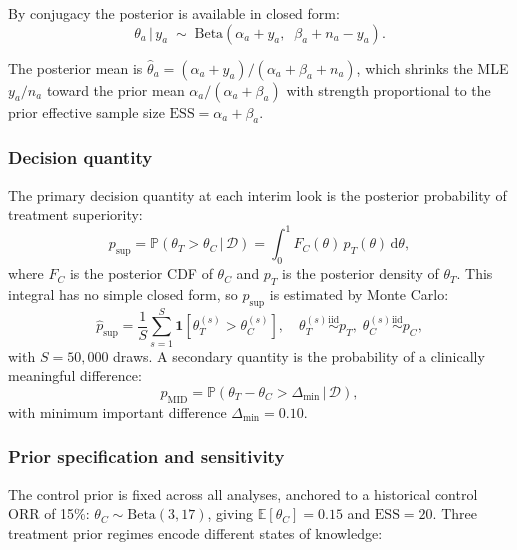 \documentclass[11pt,a4paper]{article}
\newcommand{\E}{\mathbb{E}}
\newcommand{\Prob}{\mathbb{P}}
\newcommand{\given}{\,|\,}
\newcommand{\iid}{\overset{\text{iid}}{\sim}}
\newcommand{\psup}{p_{\text{sup}}}
\newcommand{\thetaT}{\theta_T}
\newcommand{\thetaC}{\theta_C}
\begin{document}
By conjugacy the posterior is available in closed form:
\begin{equation}
  \label{eq:posterior}
  \theta_a \given y_a \;\sim\; \text{Beta}(\alpha_a + y_a,\;\; \beta_a + n_a - y_a).
\end{equation}
 
The posterior mean is $\hat{\theta}_a = (\alpha_a + y_a)/(\alpha_a + \beta_a + n_a)$,
which shrinks the MLE $y_a/n_a$ toward the prior mean $\alpha_a/(\alpha_a+\beta_a)$
with strength proportional to the prior effective sample size
$\text{ESS} = \alpha_a + \beta_a$.
 
\subsubsection{Decision quantity}
 
The primary decision quantity at each interim look is the posterior probability
of treatment superiority:
\begin{equation}
  \label{eq:psup}
  \psup
  = \Prob(\thetaT > \thetaC \given \mathcal{D})
  = \int_0^1 F_C(\theta)\,p_T(\theta)\,\mathrm{d}\theta,
\end{equation}
where $F_C$ is the posterior CDF of $\thetaC$ and $p_T$ is the posterior
density of $\thetaT$. This integral has no simple closed form, so $\psup$
is estimated by Monte Carlo:
\begin{equation}
  \hat{p}_{\text{sup}}
  = \frac{1}{S}\sum_{s=1}^{S}
    \mathbf{1}\!\left[\thetaT^{(s)} > \thetaC^{(s)}\right],
  \quad
  \thetaT^{(s)} \iid p_T,\;
  \thetaC^{(s)} \iid p_C,
\end{equation}
with $S = 50{,}000$ draws. A secondary quantity is the probability of a
clinically meaningful difference:
\begin{equation}
  \label{eq:pmid}
  p_{\text{MID}} = \Prob(\thetaT - \thetaC > \Delta_{\min} \given \mathcal{D}),
\end{equation}
with minimum important difference $\Delta_{\min} = 0.10$.
 
\subsubsection{Prior specification and sensitivity}
 
The control prior is fixed across all analyses, anchored to a historical
control ORR of 15\%: $\thetaC \sim \text{Beta}(3, 17)$, giving
$\E[\thetaC] = 0.15$ and $\text{ESS} = 20$. Three treatment prior regimes
encode different states of knowledge:
 
\end{document}
